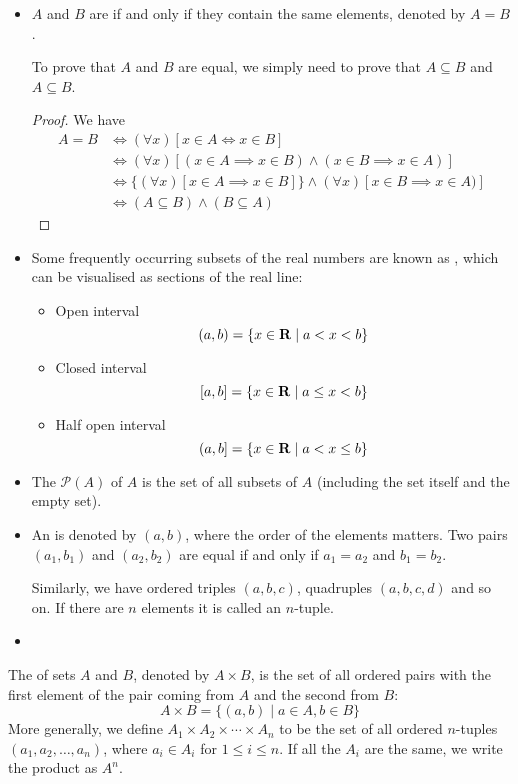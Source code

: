 \begin{itemize}
\item $A$ and $B$ are  if and only if they contain the same elements, denoted by $A=B$.

To prove that $A$ and $B$ are equal, we simply need to prove that $A \subseteq B$ and $A \subseteq B$.

\begin{proof}
We have 
\begin{align*}
A = B &\iff (\forall x)[x \in A \iff x \in B] \\
&\iff (\forall x)[(x \in A \implies x \in B) \land (x \in B \implies x \in A)] \\
&\iff \{(\forall x)[x \in A \implies x \in B]\} \land {(\forall x)[x \in B \implies x \in A)]} \\
&\iff (A \subseteq B) \land (B \subseteq A)
\end{align*}
\end{proof}

\item Some frequently occurring subsets of the real numbers are known as , which can be visualised as sections of the real line:
\begin{itemize}
\item Open interval
\[ (a,b) = \{x\in\mathbf R \mid a<x<b\} \]
\item Closed interval
\[ [a,b] = \{x\in\mathbf R \mid a\le x<b\} \]
\item Half open interval
\[ (a,b] = \{x\in\mathbf R \mid a<x\le b\} \]
\end{itemize}

\item The  $\mathcal{P}(A)$ of $A$ is the set of all subsets of $A$ (including the set itself and the empty set).

\item An  is denoted by $(a,b)$, where the order of the elements matters. Two pairs $(a_1,b_1)$ and $(a_2,b_2)$ are equal if and only if $a_1=a_2$ and $b_1=b_2$. 

Similarly, we have ordered triples $(a,b,c)$, quadruples $(a,b,c,d)$ and so on. If there are $n$ elements it is called an $n$-tuple.

\item 
\end{itemize}

The  of sets $A$ and $B$, denoted by $A \times B$, is the set of all ordered pairs with the first element of the pair coming from $A$ and the
second from $B$:
\begin{equation}
A \times B = \{(a,b) \mid a \in A, b \in B\}
\end{equation}
More generally, we define $A_1 \times A_2 \times \cdots \times A_n$ to be the set of all ordered $n$-tuples $(a_1, a_2, \dots, a_n)$, where $a_i \in A_i$ for $1 \le i \le n$. If all the $A_i$ are the same, we write the product as $A^n$.

